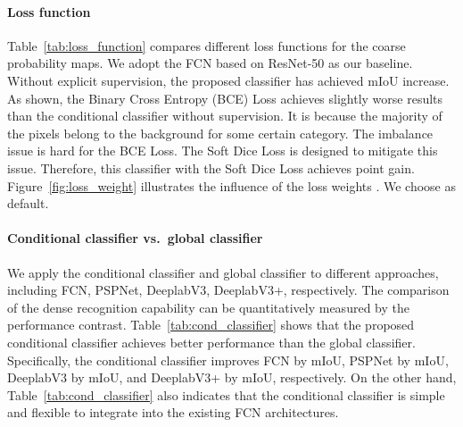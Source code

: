 \documentclass[journal]{IEEEtran}
\def\vs{vs.~}
\begin{document}
\paragraph{Loss function}
Table~\ref{tab:loss_function} compares different loss functions
for the coarse probability maps.
We adopt the FCN based on ResNet-50 as our baseline.
Without explicit supervision,
the proposed classifier has achieved
 mIoU increase.
As shown, the Binary Cross Entropy (BCE) Loss
achieves slightly worse results 
than the conditional classifier without supervision.
It is because
the majority of the pixels belong to the background for some certain category.
The imbalance issue is hard for the BCE Loss.
The Soft Dice Loss is designed to 
mitigate this issue.
Therefore,
this classifier with the Soft Dice Loss 
achieves
 point gain.
Figure~\ref{fig:loss_weight}
illustrates the influence of the loss weights .
We choose  as default.


\paragraph{Conditional classifier \vs global classifier}
We apply the conditional classifier and global classifier
to different approaches,
including FCN, PSPNet, DeeplabV3, DeeplabV3+,
respectively.
The comparison of the dense recognition capability 
can be quantitatively measured by the performance contrast.
Table~\ref{tab:cond_classifier}
shows that the proposed conditional classifier
achieves better performance than the global classifier.
Specifically,
the conditional classifier improves 
FCN by  mIoU,
PSPNet by  mIoU,
DeeplabV3 by  mIoU,
and DeeplabV3+ by  mIoU,
respectively.
On the other hand,
Table~\ref{tab:cond_classifier}
also indicates
that the conditional classifier
is simple and flexible to 
integrate into the existing FCN architectures.
\end{document}
